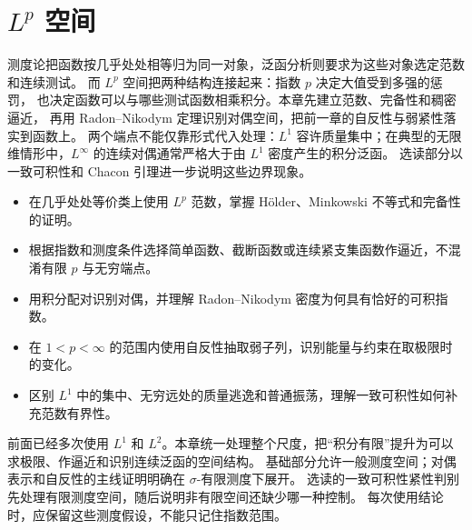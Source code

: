 \chapter{\texorpdfstring{\(L^p\)}{Lᵖ} 空间}
\label{b1:ch:10}
\begin{chapterabstract}
测度论把函数按几乎处处相等归为同一对象，泛函分析则要求为这些对象选定范数和连续测试。
而 \(L^p\) 空间把两种结构连接起来：指数 \(p\) 决定大值受到多强的惩罚，
也决定函数可以与哪些测试函数相乘积分。本章先建立范数、完备性和稠密逼近，
再用 Radon--Nikodym 定理识别对偶空间，把前一章的自反性与弱紧性落实到函数上。
两个端点不能仅靠形式代入处理：\(L^1\) 容许质量集中；在典型的无限维情形中，\(L^\infty\) 的连续对偶通常严格大于由 \(L^1\) 密度产生的积分泛函。
选读部分以一致可积性和 Chacon 引理进一步说明这些边界现象。
\end{chapterabstract}

\begin{learninggoals}
\begin{itemize}
\item\label{b1:item:10-goal-norm}在几乎处处等价类上使用 \(L^p\) 范数，掌握 Hölder、Minkowski 不等式和完备性的证明。
\item\label{b1:item:10-goal-density}根据指数和测度条件选择简单函数、截断函数或连续紧支集函数作逼近，不混淆有限 \(p\) 与无穷端点。
\item\label{b1:item:10-goal-duality}用积分配对识别对偶，并理解 Radon--Nikodym 密度为何具有恰好的可积指数。
\item\label{b1:item:10-goal-weak}在 \(1<p<\infty\) 的范围内使用自反性抽取弱子列，识别能量与约束在取极限时的变化。
\item\label{b1:item:10-goal-endpoints}区别 \(L^1\) 中的集中、无穷远处的质量逃逸和普通振荡，理解一致可积性如何补充范数有界性。
\end{itemize}
\end{learninggoals}

前面已经多次使用 \(L^1\) 和 \(L^2\)。本章统一处理整个尺度，把“积分有限”提升为可以求极限、作逼近和识别连续泛函的空间结构。
基础部分允许一般测度空间；对偶表示和自反性的主线证明明确在 \(\sigma\)-有限测度下展开。
选读的一致可积性紧性判别先处理有限测度空间，随后说明非有限空间还缺少哪一种控制。
每次使用结论时，应保留这些测度假设，不能只记住指数范围。

